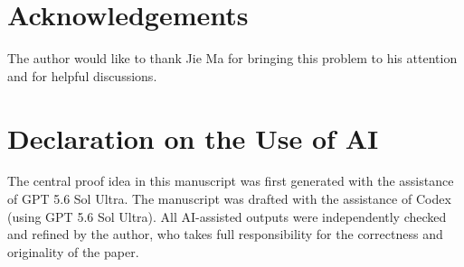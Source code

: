 \documentclass[11pt]{article}
\numberwithin{equation}{section}
\theoremstyle{remark}
\begin{document}
\section*{Acknowledgements}
The author would like to thank Jie Ma for bringing this problem to his attention and for helpful discussions.

\section*{Declaration on the Use of AI}
The central proof idea in this manuscript was first generated with the assistance of GPT 5.6 Sol Ultra. The manuscript was drafted with the assistance of Codex (using GPT 5.6 Sol Ultra). All AI-assisted outputs were independently checked and refined by the author, who takes full responsibility for the correctness and originality of the paper.

\printbibliography
\end{document}
